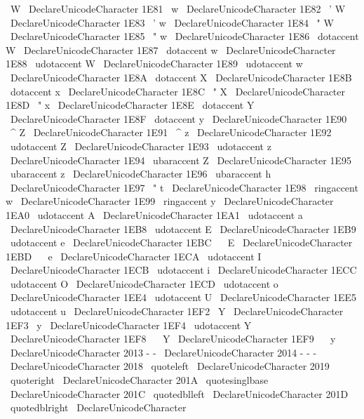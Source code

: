 {{{{{{\
W
}
\
DeclareUnicodeCharacter
{
1E81
}
{
\
w
}
\
DeclareUnicodeCharacter
{
1E82
}
{
\
'
W
}
\
DeclareUnicodeCharacter
{
1E83
}
{
\
'
w
}
\
DeclareUnicodeCharacter
{
1E84
}
{
\
"
W
}
\
DeclareUnicodeCharacter
{
1E85
}
{
\
"
w
}
\
DeclareUnicodeCharacter
{
1E86
}
{
\
dotaccent
{
W
}
}
\
DeclareUnicodeCharacter
{
1E87
}
{
\
dotaccent
{
w
}
}
\
DeclareUnicodeCharacter
{
1E88
}
{
\
udotaccent
{
W
}
}
\
DeclareUnicodeCharacter
{
1E89
}
{
\
udotaccent
{
w
}
}
\
DeclareUnicodeCharacter
{
1E8A
}
{
\
dotaccent
{
X
}
}
\
DeclareUnicodeCharacter
{
1E8B
}
{
\
dotaccent
{
x
}
}
\
DeclareUnicodeCharacter
{
1E8C
}
{
\
"
X
}
\
DeclareUnicodeCharacter
{
1E8D
}
{
\
"
x
}
\
DeclareUnicodeCharacter
{
1E8E
}
{
\
dotaccent
{
Y
}
}
\
DeclareUnicodeCharacter
{
1E8F
}
{
\
dotaccent
{
y
}
}
\
DeclareUnicodeCharacter
{
1E90
}
{
\
^
Z
}
\
DeclareUnicodeCharacter
{
1E91
}
{
\
^
z
}
\
DeclareUnicodeCharacter
{
1E92
}
{
\
udotaccent
{
Z
}
}
\
DeclareUnicodeCharacter
{
1E93
}
{
\
udotaccent
{
z
}
}
\
DeclareUnicodeCharacter
{
1E94
}
{
\
ubaraccent
{
Z
}
}
\
DeclareUnicodeCharacter
{
1E95
}
{
\
ubaraccent
{
z
}
}
\
DeclareUnicodeCharacter
{
1E96
}
{
\
ubaraccent
{
h
}
}
\
DeclareUnicodeCharacter
{
1E97
}
{
\
"
t
}
\
DeclareUnicodeCharacter
{
1E98
}
{
\
ringaccent
{
w
}
}
\
DeclareUnicodeCharacter
{
1E99
}
{
\
ringaccent
{
y
}
}
\
DeclareUnicodeCharacter
{
1EA0
}
{
\
udotaccent
{
A
}
}
\
DeclareUnicodeCharacter
{
1EA1
}
{
\
udotaccent
{
a
}
}
\
DeclareUnicodeCharacter
{
1EB8
}
{
\
udotaccent
{
E
}
}
\
DeclareUnicodeCharacter
{
1EB9
}
{
\
udotaccent
{
e
}
}
\
DeclareUnicodeCharacter
{
1EBC
}
{
\
~
E
}
\
DeclareUnicodeCharacter
{
1EBD
}
{
\
~
e
}
\
DeclareUnicodeCharacter
{
1ECA
}
{
\
udotaccent
{
I
}
}
\
DeclareUnicodeCharacter
{
1ECB
}
{
\
udotaccent
{
i
}
}
\
DeclareUnicodeCharacter
{
1ECC
}
{
\
udotaccent
{
O
}
}
\
DeclareUnicodeCharacter
{
1ECD
}
{
\
udotaccent
{
o
}
}
\
DeclareUnicodeCharacter
{
1EE4
}
{
\
udotaccent
{
U
}
}
\
DeclareUnicodeCharacter
{
1EE5
}
{
\
udotaccent
{
u
}
}
\
DeclareUnicodeCharacter
{
1EF2
}
{
\
Y
}
\
DeclareUnicodeCharacter
{
1EF3
}
{
\
y
}
\
DeclareUnicodeCharacter
{
1EF4
}
{
\
udotaccent
{
Y
}
}
\
DeclareUnicodeCharacter
{
1EF8
}
{
\
~
Y
}
\
DeclareUnicodeCharacter
{
1EF9
}
{
\
~
y
}
\
DeclareUnicodeCharacter
{
2013
}
{
-
-
}
\
DeclareUnicodeCharacter
{
2014
}
{
-
-
-
}
\
DeclareUnicodeCharacter
{
2018
}
{
\
quoteleft
}
\
DeclareUnicodeCharacter
{
2019
}
{
\
quoteright
}
\
DeclareUnicodeCharacter
{
201A
}
{
\
quotesinglbase
}
\
DeclareUnicodeCharacter
{
201C
}
{
\
quotedblleft
}
\
DeclareUnicodeCharacter
{
201D
}
{
\
quotedblright
}
\
DeclareUnicodeCharacter
}}}}}
